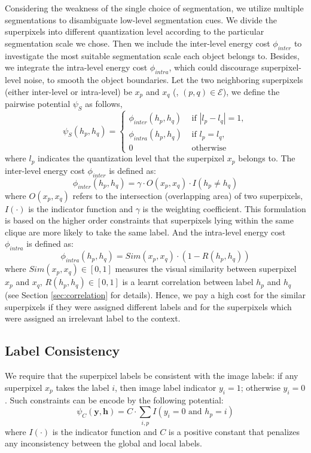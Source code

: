 Considering the weakness of the single choice of segmentation, we utilize multiple segmentations to disambiguate low-level segmentation cues. We divide the superpixels into different quantization level according to the particular segmentation scale we chose. Then we include the inter-level energy cost $\phi_{inter}$ to investigate the most suitable segmentation scale each object belongs to. Besides, we integrate the intra-level energy cost $\phi_{intra}$, which could discourage superpixel-level noise, to smooth the object boundaries. Let the two neighboring superpixels (either inter-level or intra-level) be $x_p$ and $x_q$ (\ie, $(p,q) \in \mathcal{E}$), we define the pairwise potential $\psi_S$ as follows,
\begin{equation}
    \psi_{S}(h_p,h_q) =
    \begin{cases}
        \phi_{inter}(h_p,h_q) &\mbox{ if } | l_p - l_q | = 1,
        \\
        \phi_{intra}(h_p,h_q) &\mbox{ if } l_p = l_q,
        \\
        0 &\mbox{ otherwise }
    \end{cases}
\end{equation}
where $l_p$ indicates the quantization level that the superpixel $x_p$ belongs to.
The inter-level energy cost $\phi_{inter}$ is defined as:
\begin{equation}
    \phi_{inter}(h_p,h_q) = \gamma \cdot O(x_p,x_q) \cdot I(h_p \neq h_q)
\end{equation}
where $O(x_p,x_q)$ refers to the intersection (overlapping area) of two superpixels, $I(\cdot)$ is the indicator function and $\gamma$ is the weighting coefficient. This formulation is based on the higher order constraints \cite{kohli2009robust,ladicky2009associative} that superpixels lying within the same clique are more likely to take the same label.
And the intra-level energy cost $\phi_{intra}$ is defined as:
\begin{equation}
    \phi_{intra}(h_p,h_q) = Sim(x_p,x_q) \cdot (1-R(h_p,h_q))
\end{equation}
where $Sim(x_p,x_q) \in [0,1]$ measures the visual similarity between superpixel $x_p$ and $x_q$, $R(h_p,h_q) \in [0,1]$ is a learnt correlation between label $h_p$ and $h_q$ (see Section \ref{sec:correlation} for details). Hence, we pay a high cost for the similar superpixels if they were assigned different labels and for the superpixels which were assigned an irrelevant label to the context.

\subsection{Label Consistency}
We require that the superpixel labels be consistent with the image labels: if any superpixel $x_p$ takes the label $i$, then image label indicator $y_i=1$; otherwise $y_i=0$. Such constraints can be encode by the following potential:
\begin{equation}
    \psi_{C}(\boldsymbol{y},\boldsymbol{h}) =
    C \cdot \sum_{i,p} I(y_i=0 \mbox{ and } h_p=i)
\end{equation}
where $I(\cdot)$ is the indicator function and $C$ is a positive constant that penalizes any inconsistency between the global and local labels.

